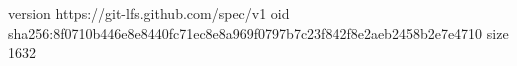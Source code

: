 version https://git-lfs.github.com/spec/v1
oid sha256:8f0710b446e8e8440fc71ec8e8a969f0797b7c23f842f8e2aeb2458b2e7e4710
size 1632
